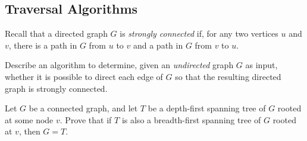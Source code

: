 \begin{exercises}
\subsection*{Traversal Algorithms}

\item Recall that a directed graph $G$ is \textit{strongly connected} if, for any two vertices $u$ and $v$, there is a path in $G$ from $u$ to $v$ and a path in $G$ from $v$ to $u$.

Describe an algorithm to determine, given an \textit{undirected} graph $G$ as input, whether it is possible to direct each edge of $G$ so that the resulting directed graph is strongly connected.

\item Let $G$ be a connected graph, and let $T$ be a depth-first spanning tree of $G$ rooted at some node $v$.
Prove that if $T$ is also a breadth-first spanning tree of $G$ rooted at $v$, then $G = T$.


\end{exercises}
